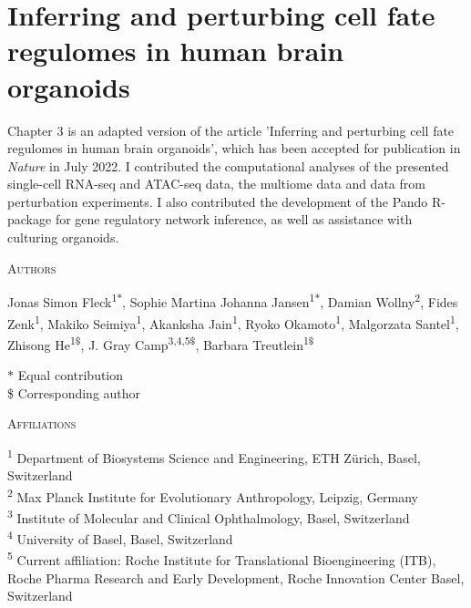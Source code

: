\thispagestyle{plain}
\section{Inferring and perturbing cell fate regulomes in human brain organoids}


\vspace{0.5cm}

Chapter 3 is an adapted version of the article 'Inferring and perturbing cell fate regulomes in human brain organoids', which has been accepted for publication in \textit{Nature} in July 2022. I contributed the computational analyses of the presented single-cell RNA-seq and ATAC-seq data, the multiome data and data from perturbation experiments. I also contributed the development of the Pando R-package for gene regulatory network inference, as well as assistance with culturing organoids.

\vspace{1cm}

\noindent
{\large\textsc{Authors}}

\noindent
Jonas Simon Fleck\textsuperscript{1$*$}, 
Sophie Martina Johanna Jansen\textsuperscript{1$*$}, 
Damian Wollny\textsuperscript{2}, 
Fides Zenk\textsuperscript{1}, 
Makiko Seimiya\textsuperscript{1}, 
Akanksha Jain\textsuperscript{1}, 
Ryoko Okamoto\textsuperscript{1}, 
Malgorzata Santel\textsuperscript{1}, 
Zhisong He\textsuperscript{1\$}, 
J. Gray Camp\textsuperscript{3,4,5\$}, 
Barbara Treutlein\textsuperscript{1\$}

\vspace{0.5cm}

\noindent
$\ast$ Equal contribution\\
\$ Corresponding author

\vspace{1cm}

\noindent
{\large\textsc{Affiliations}}

\noindent
\textsuperscript{1} Department of Biosystems Science and Engineering, ETH Zürich, Basel, Switzerland\\
\textsuperscript{2} Max Planck Institute for Evolutionary Anthropology, Leipzig, Germany\\
\textsuperscript{3} Institute of Molecular and Clinical Ophthalmology, Basel, Switzerland\\
\textsuperscript{4} University of Basel, Basel, Switzerland\\
\textsuperscript{5} Current affiliation: Roche Institute for Translational Bioengineering (ITB), Roche Pharma Research and Early Development, Roche Innovation Center Basel, Switzerland

